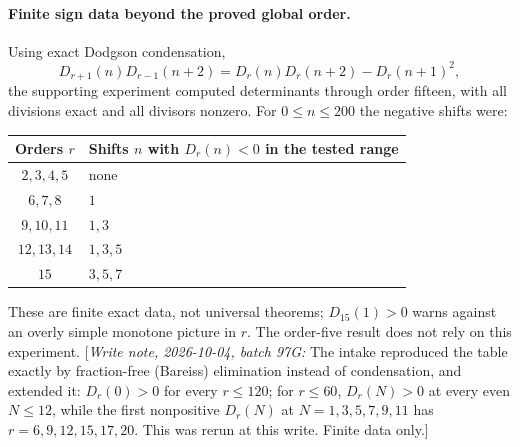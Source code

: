 \documentclass[11pt,letterpaper]{article}
\theoremstyle{remark}\newtheorem{remark}[theorem]{Remark}
\newcommand{\hpnote}[1]{\textup{[}\emph{Write note, 2026-10-04, batch 97G:} #1\textup{]}}
\newcounter{l7gtrsavedeq}
\begin{document}
\paragraph{Finite sign data beyond the proved global order.}
Using exact Dodgson condensation,
\begin{equation}\label{l7g:hp:eq:dodgson}
 D_{r+1}(n)D_{r-1}(n+2)=D_r(n)D_r(n+2)-D_r(n+1)^2,
\end{equation}
the supporting experiment computed determinants through order fifteen, with
all divisions exact and all divisors nonzero. For $0\le n\le200$ the
negative shifts were:
\begin{center}\small
\begin{tabular}{cl}
\toprule
Orders $r$ & Shifts $n$ with $D_r(n)<0$ in the tested range\\
\midrule
$2,3,4,5$ & none\\
$6,7,8$ & $1$\\
$9,10,11$ & $1,3$\\
$12,13,14$ & $1,3,5$\\
$15$ & $3,5,7$\\
\bottomrule
\end{tabular}
\end{center}
These are finite exact data, not universal theorems; $D_{15}(1)>0$ warns
against an overly simple monotone picture in $r$. The order-five result does
not rely on this experiment. \hpnote{The intake reproduced the table exactly
by fraction-free (Bareiss) elimination instead of condensation, and extended
it: $D_r(0)>0$ for every $r\le120$; for $r\le60$, $D_r(N)>0$ at every even
$N\le12$, while the first nonpositive $D_r(N)$ at $N=1,3,5,7,9,11$ has
$r=6,9,12,15,17,20$. This was rerun at this write. Finite data only.}
\end{document}

